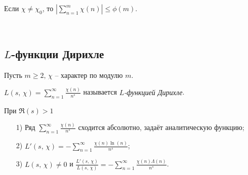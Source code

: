 \begin{corollary} \label{l6_cor}
	Если $\chi \ne \chi_0$, то $\displaystyle \left| \sum\limits_{n=1}^m \chi(n) \right| \leq \phi(m)$.
\end{corollary}~\\

\subsection{$L$-функции Дирихле}
Пусть $m \geq 2, \, \chi$ -- характер по модулю $m$.
\begin{definition}
	$\displaystyle L(s, \, \chi) = \sum\limits_{n=1}^\infty \frac{\chi(n)}{n^s}$ называется \textit{$L$-функцией Дирихле}.
\end{definition}

\begin{lemma} \label{l6_lm4}
	При $\Re(s) > 1$
	\begin{enumerate}
		\item[1)] Ряд $\displaystyle \sum\limits_{n=1}^\infty \frac{\chi(n)}{n^s}$ сходится абсолютно, задаёт аналитическую функцию;
		\item[2)] $\displaystyle L'(s, \, \chi) = -\sum\limits_{n=1}^\infty \frac{\chi(n)\ln(n)}{n^s}$;
		\item[3)] $\displaystyle L(s, \, \chi) \ne 0$ и $\frac{L'(s,\,\chi)}{L(s,\,\chi)} = -\sum\limits_{n=1}^\infty \frac{\chi(n)\Lambda(n)}{n^s}$.
	\end{enumerate}
\end{lemma}
